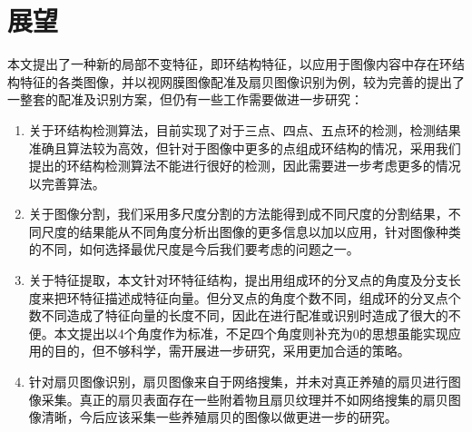 \section{展望}
\label{}
本文提出了一种新的局部不变特征，即环结构特征，以应用于图像内容中存在环结构特征的各类图像，并以视网膜图像配准及扇贝图像识别为例，较为完善的提出了一整套的配准及识别方案，但仍有一些工作需要做进一步研究：
\begin{enumerate}
\item 关于环结构检测算法，目前实现了对于三点、四点、五点环的检测，检测结果准确且算法较为高效，但针对于图像中更多的点组成环结构的情况，采用我们提出的环结构检测算法不能进行很好的检测，因此需要进一步考虑更多的情况以完善算法。
\item 关于图像分割，我们采用多尺度分割的方法能得到成不同尺度的分割结果，不同尺度的结果能从不同角度分析出图像的更多信息以加以应用，针对图像种类的不同，如何选择最优尺度是今后我们要考虑的问题之一。
\item 关于特征提取，本文针对环特征结构，提出用组成环的分叉点的角度及分支长度来把环特征描述成特征向量。但分叉点的角度个数不同，组成环的分叉点个数不同造成了特征向量的长度不同，因此在进行配准或识别时造成了很大的不便。本文提出以4个角度作为标准，不足四个角度则补充为0的思想虽能实现应用的目的，但不够科学，需开展进一步研究，采用更加合适的策略。
\item 针对扇贝图像识别，扇贝图像来自于网络搜集，并未对真正养殖的扇贝进行图像采集。真正的扇贝表面存在一些附着物且扇贝纹理并不如网络搜集的扇贝图像清晰，今后应该采集一些养殖扇贝的图像以做更进一步的研究。
\end{enumerate}
